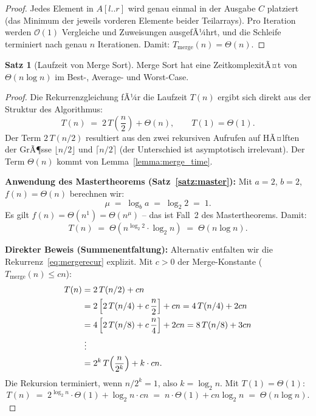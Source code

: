 ﻿\documentclass[a4paper,12pt]{article}
\theoremstyle{definition}
\newtheorem{satz}{Satz}
\begin{document}
\begin{proof}
    Jedes Element in $A[l..r]$ wird genau einmal in der Ausgabe $C$ platziert
    (das Minimum der jeweils vorderen Elemente beider Teilarrays). Pro Iteration
    werden $\mathcal{O}(1)$ Vergleiche und Zuweisungen ausgefÃ¼hrt, und die Schleife
    terminiert nach genau $n$ Iterationen. Damit: $T_{\mathrm{merge}}(n) = \Theta(n)$.
    \qedhere
\end{proof}

\begin{satz}[Laufzeit von Merge Sort]
    \label{satz:ms_runtime}
    Merge Sort hat eine ZeitkomplexitÃ¤t von $\Theta(n \log n)$ im
    Best-, Average- und Worst-Case.
\end{satz}

\begin{proof}
    Die Rekurrenzgleichung fÃ¼r die Laufzeit $T(n)$ ergibt sich direkt aus der
    Struktur des Algorithmus:
    \begin{equation}
        T(n) \;=\; 2\,T\!\left(\frac{n}{2}\right) + \Theta(n), \qquad T(1) = \Theta(1).
        \label{eq:mergerecur}
    \end{equation}
    Der Term $2\,T(n/2)$ resultiert aus den zwei rekursiven Aufrufen auf HÃ¤lften
    der GrÃ¶sse $\lfloor n/2 \rfloor$ und $\lceil n/2 \rceil$ (der Unterschied ist
    asymptotisch irrelevant). Der Term $\Theta(n)$ kommt von Lemma~\ref{lemma:merge_time}.

    \textbf{Anwendung des Mastertheorems (Satz~\ref{satz:master}):}
    Mit $a = 2$, $b = 2$, $f(n) = \Theta(n)$ berechnen wir:
    \[
        \mu \;=\; \log_b a \;=\; \log_2 2 \;=\; 1.
    \]
    Es gilt $f(n) = \Theta(n^1) = \Theta(n^\mu)$ -- das ist Fall~2 des
    Mastertheorems. Damit:
    \[
        T(n) \;=\; \Theta\!\left(n^{\log_2 2} \cdot \log_2 n\right)
              \;=\; \Theta(n \log n).
    \]

    \textbf{Direkter Beweis (Summenentfaltung):}
    Alternativ entfalten wir die Rekurrenz~\eqref{eq:mergerecur} explizit.
    Mit $c > 0$ der Merge-Konstante ($T_{\mathrm{merge}}(n) \leq cn$):
    \begin{align}
        T(n) &= 2\,T(n/2) + cn \notag\\
             &= 2\left[2\,T(n/4) + c\,\frac{n}{2}\right] + cn
              = 4\,T(n/4) + 2cn \notag\\
             &= 4\left[2\,T(n/8) + c\,\frac{n}{4}\right] + 2cn
              = 8\,T(n/8) + 3cn \notag\\
             &\;\vdots \notag\\
             &= 2^k\,T\!\left(\frac{n}{2^k}\right) + k \cdot cn. \notag
    \end{align}
    Die Rekursion terminiert, wenn $n/2^k = 1$, also $k = \log_2 n$.
    Mit $T(1) = \Theta(1)$:
    \begin{equation}
        T(n) \;=\; 2^{\log_2 n} \cdot \Theta(1) + \log_2 n \cdot cn
              \;=\; n \cdot \Theta(1) + cn \log_2 n
              \;=\; \Theta(n \log n). \label{eq:ms_final}
    \end{equation}


\end{proof}
\end{document}
